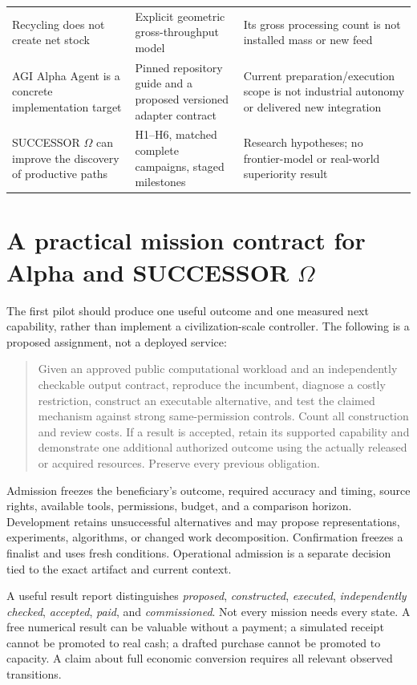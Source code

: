\documentclass[11pt,letterpaper]{article}
\newcommand{\1}{\mathbf 1}
\theoremstyle{remark}\newtheorem{remark}{Remark}[section]
\begin{document}
\begin{longtable}{@{}P{.29\linewidth}P{.33\linewidth}P{.32\linewidth}@{}}
Recycling does not create net stock & Explicit geometric gross-throughput model & Its gross processing count is not installed mass or new feed\\
AGI Alpha Agent is a concrete implementation target & Pinned repository guide and a proposed versioned adapter contract & Current preparation/execution scope is not industrial autonomy or delivered new integration\\
SUCCESSOR $\Omega$ can improve the discovery of productive paths & H1--H6, matched complete campaigns, staged milestones & Research hypotheses; no frontier-model or real-world superiority result\\
\bottomrule
\end{longtable}
\normalsize

\clearpage
\section{A practical mission contract for Alpha and SUCCESSOR \texorpdfstring{$\Omega$}{Omega}}\label{app:pilot}
The first pilot should produce one useful outcome and one measured next capability, rather than implement a civilization-scale controller. The following is a proposed assignment, not a deployed service:
\begin{quote}
Given an approved public computational workload and an independently checkable output contract, reproduce the incumbent, diagnose a costly restriction, construct an executable alternative, and test the claimed mechanism against strong same-permission controls. Count all construction and review costs. If a result is accepted, retain its supported capability and demonstrate one additional authorized outcome using the actually released or acquired resources. Preserve every previous obligation.
\end{quote}

Admission freezes the beneficiary's outcome, required accuracy and timing, source rights, available tools, permissions, budget, and a comparison horizon. Development retains unsuccessful alternatives and may propose representations, experiments, algorithms, or changed work decomposition. Confirmation freezes a finalist and uses fresh conditions. Operational admission is a separate decision tied to the exact artifact and current context.

A useful result report distinguishes \emph{proposed}, \emph{constructed}, \emph{executed}, \emph{independently checked}, \emph{accepted}, \emph{paid}, and \emph{commissioned}. Not every mission needs every state. A free numerical result can be valuable without a payment; a simulated receipt cannot be promoted to real cash; a drafted purchase cannot be promoted to capacity. A claim about full economic conversion requires all relevant observed transitions.
\end{document}
